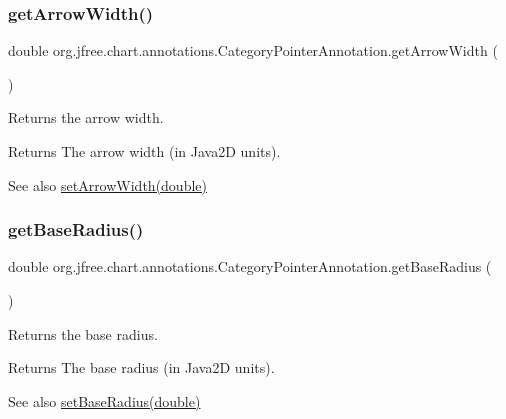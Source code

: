 \subsubsection{\texorpdfstring{get\+Arrow\+Width()}{getArrowWidth()}}
{\footnotesize\ttfamily double org.\+jfree.\+chart.\+annotations.\+Category\+Pointer\+Annotation.\+get\+Arrow\+Width (\begin{DoxyParamCaption}{ }\end{DoxyParamCaption})}

Returns the arrow width.

\begin{DoxyReturn}{Returns}
The arrow width (in Java2D units).
\end{DoxyReturn}
\begin{DoxySeeAlso}{See also}
\mbox{\hyperlink{classorg_1_1jfree_1_1chart_1_1annotations_1_1_category_pointer_annotation_a8f025db11131888280f64eaf79315dbe}{set\+Arrow\+Width(double)}} 
\end{DoxySeeAlso}
\mbox{\label{classorg_1_1jfree_1_1chart_1_1annotations_1_1_category_pointer_annotation_a5e053ef26450a0e636562e187c0f0f1e}} 
\subsubsection{\texorpdfstring{get\+Base\+Radius()}{getBaseRadius()}}
{\footnotesize\ttfamily double org.\+jfree.\+chart.\+annotations.\+Category\+Pointer\+Annotation.\+get\+Base\+Radius (\begin{DoxyParamCaption}{ }\end{DoxyParamCaption})}

Returns the base radius.

\begin{DoxyReturn}{Returns}
The base radius (in Java2D units).
\end{DoxyReturn}
\begin{DoxySeeAlso}{See also}
\mbox{\hyperlink{classorg_1_1jfree_1_1chart_1_1annotations_1_1_category_pointer_annotation_ac28199dd33de04d60fd96c8e9e5a3773}{set\+Base\+Radius(double)}} 
\end{DoxySeeAlso}
\mbox{\label{classorg_1_1jfree_1_1chart_1_1annotations_1_1_category_pointer_annotation_afd01fc3fde080f86d3491cb491d84cad}} 
